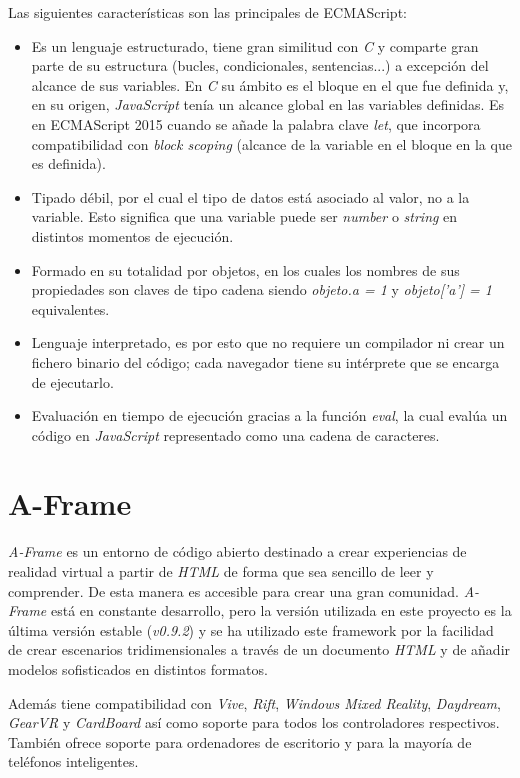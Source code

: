 Las siguientes características son las principales de ECMAScript: 
\begin{itemize}
    \item Es un lenguaje estructurado, tiene gran similitud con \textit{C} y comparte gran parte de su estructura (bucles, condicionales, sentencias...) a excepción del alcance de sus variables. En \textit{C} su ámbito es el bloque en el que fue definida y, en su origen, \textit{JavaScript} tenía un alcance global en las variables definidas. Es en ECMAScript 2015 cuando se añade la palabra clave \textit{let}, que incorpora compatibilidad con \textit{block scoping} (alcance de la variable en el bloque en la que es definida). 
    \item Tipado débil, por el cual el tipo de datos está asociado al valor, no a la variable. Esto significa que una variable puede ser \textit{number} o \textit{string} en distintos momentos de ejecución. 
    \item Formado en su totalidad por objetos, en los cuales los nombres de sus propiedades son claves de tipo cadena siendo \textit{objeto.a = 1} y \textit{objeto['a'] = 1} equivalentes. 
    \item Lenguaje interpretado, es por esto que no requiere un compilador ni crear un fichero binario del código; cada navegador tiene su intérprete que se encarga de ejecutarlo.
    \item Evaluación en tiempo de ejecución gracias a la función \textit{eval}, la cual evalúa un código en \textit{JavaScript} representado como una cadena de caracteres. 
\end{itemize}
\section{A-Frame}
\label{sec:aframe}
\textit{A-Frame} es un entorno de código abierto destinado a crear experiencias de realidad virtual a partir de \textit{HTML} de forma que sea sencillo de leer y comprender. De esta manera es accesible para crear una gran comunidad. \textit{A-Frame} está en constante desarrollo, pero la versión utilizada en este proyecto es la última versión estable (\textit{v0.9.2}) y se ha utilizado este framework por la facilidad de crear escenarios tridimensionales a través de un documento \textit{HTML} y de añadir modelos sofisticados en distintos formatos.

Además tiene compatibilidad con \textit{Vive}, \textit{Rift}, \textit{Windows Mixed Reality}, \textit{Daydream}, \textit{GearVR} y \textit{CardBoard} así como soporte para todos los controladores respectivos. También ofrece soporte para ordenadores de escritorio y para la mayoría de teléfonos inteligentes.

